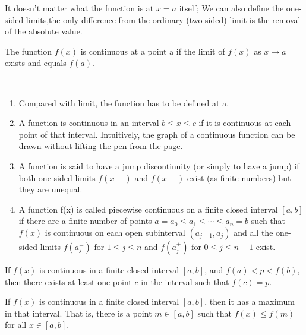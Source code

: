 \documentclass[hazy,blue,11pt]{elegantnote}
\begin{document}
\begin{note}
    It doesn’t matter what the function is at $x = a$ itself;
    We can also define the one-sided limits,the only difference from the ordinary (two-sided) limit is the removal of the absolute value.
\end{note}

\begin{definition}[continuous]
    The function $f(x)$ is continuous at a point a if the limit of $f(x)$ as $x \to a$ exists and equals $f(a)$.
\end{definition}

\begin{note} 
~\\
\begin{enumerate}
    \item Compared with limit, the function has to be defined at a.
    \item A function is continuous in an interval $b \leq x \leq c$ if it is continuous at each point of that interval. Intuitively, the graph of a continuous function can be drawn without lifting the pen from the page.
    \item A function is said to have a jump discontinuity (or simply to have a jump) if both one-sided limits $f(x−)$ and $f(x+)$ exist (as finite numbers) but they are unequal.
    \item A function f(x) is called piecewise continuous on a finite closed interval $[a,b]$ if there are a finite number of points $a = a_0\le a_1\le \cdots \le a_n =b$ such that $f(x)$ is continuous on each open subinterval $(a_{j-1},a_j)$ and all the one-sided limits $f(a_{j}^{-})$ for $1 \le  j \le  n$ and $f(a_{j}^{+})$ for $0 \le j \le n−1$ exist.

\end{enumerate}   
\end{note}

\begin{theorem}
    If $f(x)$ is continuous in a finite closed interval $[a,b]$, and $f(a) < p < f (b)$, then there exists at least one point $c$ in the interval such that $f(c)=p$.
\end{theorem}

\begin{theorem}
    If $f(x)$ is continuous in a finite closed interval $[a,b]$, then it has a maximum in that interval. That is, there is a point $m \in [a,b]$ such that $f (x) \leq f (m)$ for all $x \in [a, b]$.
\end{theorem}
\end{document}
